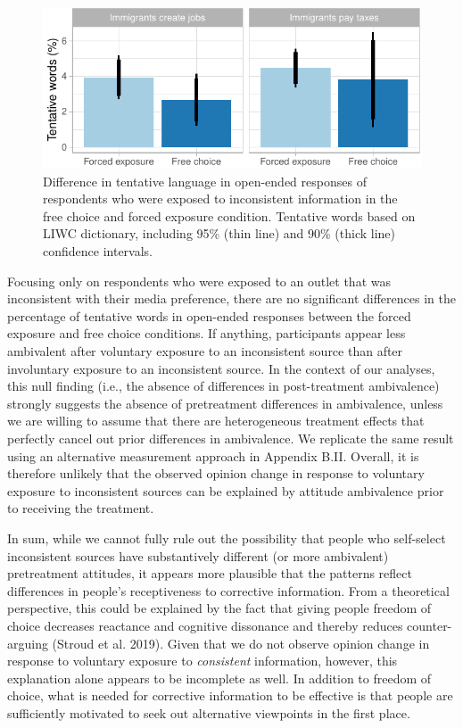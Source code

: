 \documentclass[
  12pt,
]{article}
\begin{document}
\singlespace

\begin{figure}
\centering
\includegraphics{ReliableSources_files/figure-latex/m5-1.pdf}
\caption{\label{fig:m5}Difference in tentative language in open-ended
responses of respondents who were exposed to inconsistent information in
the free choice and forced exposure condition. Tentative words based on
LIWC dictionary, including 95\% (thin line) and 90\% (thick line)
confidence intervals.}
\end{figure}

\doublespace

\noindent Focusing only on respondents who were exposed to an outlet
that was inconsistent with their media preference, there are no
significant differences in the percentage of tentative words in
open-ended responses between the forced exposure and free choice
conditions. If anything, participants appear less ambivalent after
voluntary exposure to an inconsistent source than after involuntary
exposure to an inconsistent source. In the context of our analyses, this
null finding (i.e., the absence of differences in post-treatment
ambivalence) strongly suggests the absence of pretreatment differences
in ambivalence, unless we are willing to assume that there are
heterogeneous treatment effects that perfectly cancel out prior
differences in ambivalence. We replicate the same result using an
alternative measurement approach in Appendix B.II. Overall, it is
therefore unlikely that the observed opinion change in response to
voluntary exposure to inconsistent sources can be explained by attitude
ambivalence prior to receiving the treatment.

In sum, while we cannot fully rule out the possibility that people who
self-select inconsistent sources have substantively different (or more
ambivalent) pretreatment attitudes, it appears more plausible that the
patterns reflect differences in people's receptiveness to corrective
information. From a theoretical perspective, this could be explained by
the fact that giving people freedom of choice decreases reactance and
cognitive dissonance and thereby reduces counter-arguing (Stroud et al.
2019). Given that we do not observe opinion change in response to
voluntary exposure to \emph{consistent} information, however, this
explanation alone appears to be incomplete as well. In addition to
freedom of choice, what is needed for corrective information to be
effective is that people are sufficiently motivated to seek out
alternative viewpoints in the first place.
\end{document}
